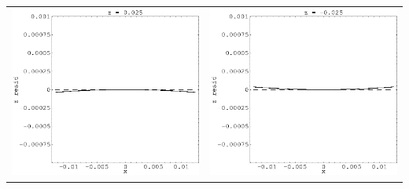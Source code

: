 \documentclass[12pt]{article}
\begin{document}
\begin{tabular}{c c}
    \includegraphics[width=7.3 cm]{layer4_left1.eps} &
    \includegraphics[width=7.3 cm]{layer4_right1.eps} \\
  \end{tabular}
\end{document}
